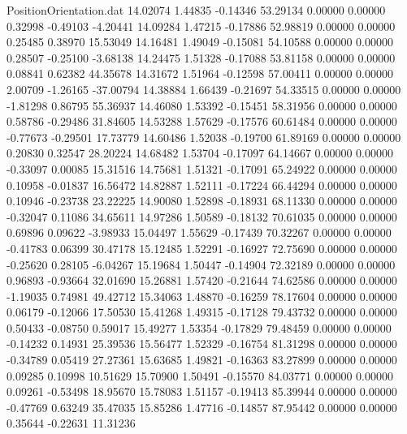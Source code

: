 \begin{filecontents}{PositionOrientation.dat}
  14.02074    1.44835   -0.14346    53.29134    0.00000    0.00000    0.32998   -0.49103   -4.20441
  14.09284    1.47215   -0.17886    52.98819    0.00000    0.00000    0.25485    0.38970   15.53049
  14.16481    1.49049   -0.15081    54.10588    0.00000    0.00000    0.28507   -0.25100   -3.68138
  14.24475    1.51328   -0.17088    53.81158    0.00000    0.00000    0.08841    0.62382   44.35678
  14.31672    1.51964   -0.12598    57.00411    0.00000    0.00000    2.00709   -1.26165  -37.00794
  14.38884    1.66439   -0.21697    54.33515    0.00000    0.00000   -1.81298    0.86795   55.36937
  14.46080    1.53392   -0.15451    58.31956    0.00000    0.00000    0.58786   -0.29486   31.84605
  14.53288    1.57629   -0.17576    60.61484    0.00000    0.00000   -0.77673   -0.29501   17.73779
  14.60486    1.52038   -0.19700    61.89169    0.00000    0.00000    0.20830    0.32547   28.20224
  14.68482    1.53704   -0.17097    64.14667    0.00000    0.00000   -0.33097    0.00085   15.31516
  14.75681    1.51321   -0.17091    65.24922    0.00000    0.00000    0.10958   -0.01837   16.56472
  14.82887    1.52111   -0.17224    66.44294    0.00000    0.00000    0.10946   -0.23738   23.22225
  14.90080    1.52898   -0.18931    68.11330    0.00000    0.00000   -0.32047    0.11086   34.65611
  14.97286    1.50589   -0.18132    70.61035    0.00000    0.00000    0.69896    0.09622   -3.98933
  15.04497    1.55629   -0.17439    70.32267    0.00000    0.00000   -0.41783    0.06399   30.47178
  15.12485    1.52291   -0.16927    72.75690    0.00000    0.00000   -0.25620    0.28105   -6.04267
  15.19684    1.50447   -0.14904    72.32189    0.00000    0.00000    0.96893   -0.93664   32.01690
  15.26881    1.57420   -0.21644    74.62586    0.00000    0.00000   -1.19035    0.74981   49.42712
  15.34063    1.48870   -0.16259    78.17604    0.00000    0.00000    0.06179   -0.12066   17.50530
  15.41268    1.49315   -0.17128    79.43732    0.00000    0.00000    0.50433   -0.08750    0.59017
  15.49277    1.53354   -0.17829    79.48459    0.00000    0.00000   -0.14232    0.14931   25.39536
  15.56477    1.52329   -0.16754    81.31298    0.00000    0.00000   -0.34789    0.05419   27.27361
  15.63685    1.49821   -0.16363    83.27899    0.00000    0.00000    0.09285    0.10998   10.51629
  15.70900    1.50491   -0.15570    84.03771    0.00000    0.00000    0.09261   -0.53498   18.95670
  15.78083    1.51157   -0.19413    85.39944    0.00000    0.00000   -0.47769    0.63249   35.47035
  15.85286    1.47716   -0.14857    87.95442    0.00000    0.00000    0.35644   -0.22631   11.31236

\end{filecontents}
